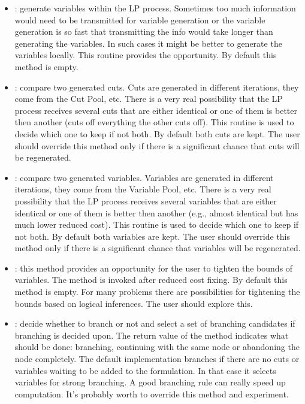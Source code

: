 \begin{itemize}
\item {}: generate variables within the LP
  process. 
  Sometimes too much information 
  would need to be transmitted for variable generation or the variable
  generation is so fast that transmitting the info would take longer than
  generating the variables. In such cases it might be better to generate
  the variables locally. This routine provides the opportunity. By default
  this method is empty.

\item {}: compare two generated cuts. Cuts are generated in
  different iterations, 
  they come from the Cut Pool, etc. There is a very real possibility that
  the LP process receives several cuts that are either identical or one
  of them is better then another (cuts off everything the other cuts
  off). This routine is used to decide which one to keep if not both. By 
  default both cuts are kept. The user should override this method only if
  there is a significant chance that cuts will be regenerated.

\item {}: compare two generated variables. Variables are
  generated in different 
  iterations, they come from the Variable Pool, etc. There is a very real
  possibility that the LP process receives several variables that are
  either identical or one of them is better then another (e.g., almost
  identical but has much lower reduced cost). This routine is used to
  decide which one to keep if not both. By 
  default both variables are kept. The user should override this method only
  if there is a significant chance that variables will be regenerated.

\item {}: this method provides an opportunity for the
  user 
  to tighten the bounds of variables. The method is invoked after reduced cost
  fixing. By default this method is empty. For many problems there are
  possibilities for tightening the bounds based on logical inferences. The
  user should explore this.

\item {}: decide whether to branch or not
  and 
  select a set of branching candidates if branching is decided upon.
  The return value of the method indicates what should be done: branching,
  continuing with the same node or abandoning the node completely. The default
  implementation branches if there are no cuts or variables waiting to be
  added to the formulation. In that case it selects variables for strong
  branching. A good branching rule can really speed up computation. It's
  probably worth to override this method and experiment.


\end{itemize}

